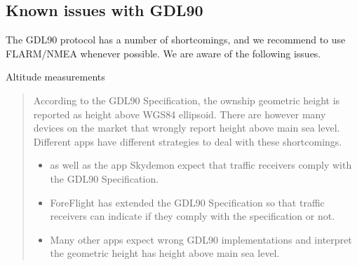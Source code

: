 \documentclass[letterpaper,10pt,english]{sphinxmanual}
\begin{document}
\subsection{Known issues with GDL90}
\label{\detokenize{04-appendix/technical:known-issues-with-gdl90}}
\sphinxAtStartPar
The GDL90 protocol has a number of shortcomings, and we recommend to use
FLARM/NMEA whenever possible.  We are aware of the following issues.

\sphinxAtStartPar
Altitude measurements
\begin{quote}

\sphinxAtStartPar
According to the GDL90 Specification, the ownship geometric height is reported
as height above WGS\sphinxhyphen{}84 ellipsoid.  There are however many devices on the
market that wrongly report height above main sea level.  Different apps have
different strategies to deal with these shortcomings.
\begin{itemize}
\item {} 
\sphinxAtStartPar
{} as well as the app Skydemon expect that
traffic receivers comply with the GDL90 Specification.

\item {} 
\sphinxAtStartPar
ForeFlight has extended the GDL90 Specification so that traffic receivers
can indicate if they comply with the specification or not.

\item {} 
\sphinxAtStartPar
Many other apps expect wrong GDL90 implementations and interpret the
geometric height has height above main sea level.

\end{itemize}
\end{quote}
\end{document}
